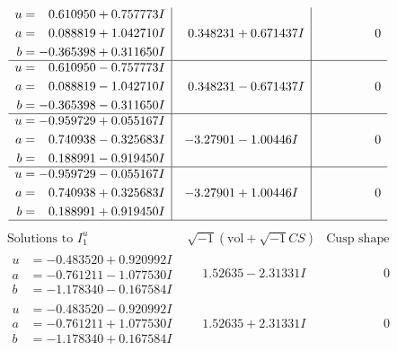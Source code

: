 \documentclass[1p]{elsarticle_modified}
\theoremstyle{definition}
\newcommand{\I}{\sqrt{-1}}
\begin{document}
$$\begin{array}{c|c|c}
\begin{aligned}
u &= \phantom{-}0.610950 + 0.757773 I \\
a &= \phantom{-}0.088819 + 1.042710 I \\
b &= -0.365398 + 0.311650 I\end{aligned}
 & \phantom{-}0.348231 + 0.671437 I & \phantom{-0.000000 } 0 \\ \hline\begin{aligned}
u &= \phantom{-}0.610950 - 0.757773 I \\
a &= \phantom{-}0.088819 - 1.042710 I \\
b &= -0.365398 - 0.311650 I\end{aligned}
 & \phantom{-}0.348231 - 0.671437 I & \phantom{-0.000000 } 0 \\ \hline\begin{aligned}
u &= -0.959729 + 0.055167 I \\
a &= \phantom{-}0.740938 - 0.325683 I \\
b &= \phantom{-}0.188991 - 0.919450 I\end{aligned}
 & -3.27901 - 1.00446 I & \phantom{-0.000000 } 0 \\ \hline\begin{aligned}
u &= -0.959729 - 0.055167 I \\
a &= \phantom{-}0.740938 + 0.325683 I \\
b &= \phantom{-}0.188991 + 0.919450 I\end{aligned}
 & -3.27901 + 1.00446 I & \phantom{-0.000000 } 0\\
 \hline 
 \end{array}$$\newpage$$\begin{array}{c|c|c}  
\text{Solutions to }I^u_{1}& \I (\text{vol} + \sqrt{-1}CS) & \text{Cusp shape}\\
 \hline 
\begin{aligned}
u &= -0.483520 + 0.920992 I \\
a &= -0.761211 - 1.077530 I \\
b &= -1.178340 - 0.167584 I\end{aligned}
 & \phantom{-}1.52635 - 2.31331 I & \phantom{-0.000000 } 0 \\ \hline\begin{aligned}
u &= -0.483520 - 0.920992 I \\
a &= -0.761211 + 1.077530 I \\
b &= -1.178340 + 0.167584 I\end{aligned}
 & \phantom{-}1.52635 + 2.31331 I & \phantom{-0.000000 } 0 \\ \hline\begin{aligned}

\end{aligned}
\end{array}$$
\end{document}
